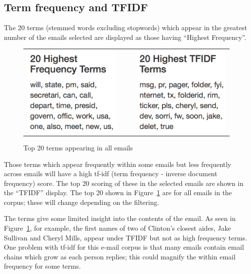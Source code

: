 \documentclass[journal]{vgtc}                %
\begin{document}
\subsection{Term frequency and TFIDF}
\label{sect:Displays:TFIDF}
The 20 terms (stemmed words excluding stopwords) which appear in the greatest number of the emails selected are displayed as those having ``Highest Frequency''.  
\begin{figure}[h]
\begin{center}
\begin{tabular}{ccc}
\includegraphics[width=0.4\linewidth]{HighFreqAll} &
$~~~~$ &
\includegraphics[width=0.4\linewidth]{HighTFIDFAll} 
\end{tabular}
\caption{Top 20 terms appearing in all emails}
\label{fig:top20all}
\end{center}
\end{figure}
Those terms which appear frequently within some emails but less frequently across emails will have a high tf-idf (term frequency - inverse document frequency) score.  The top 20 scoring of these in the selected emails are shown in the ``TFIDF'' display. 
The top 20 shown in Figure~\ref{fig:top20all} are for all emails in the corpus; these will change depending on the filtering.

The terms give some limited insight into the contents of the email.  As seen in Figure~\ref{fig:top20all}, for example, the first names of two of Clinton's closest aides, Jake Sullivan and Cheryl Mills,  appear under TFIDF but not  as high frequency terms.  One problem with tf-idf for this e-mail corpus is that many emails contain email chains which grow as each person replies; this could magnify the within email frequency for some terms.
\end{document}
